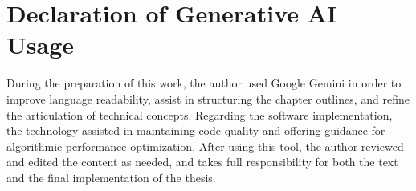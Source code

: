 \section*{Declaration of Generative AI Usage}
During the preparation of this work, the author used Google Gemini in order to improve language readability, assist in structuring the chapter outlines, and refine the articulation of technical concepts. Regarding the software implementation, the technology assisted in maintaining code quality and offering guidance for algorithmic performance optimization. After using this tool, the author reviewed and edited the content as needed, and takes full responsibility for both the text and the final implementation of the thesis.
